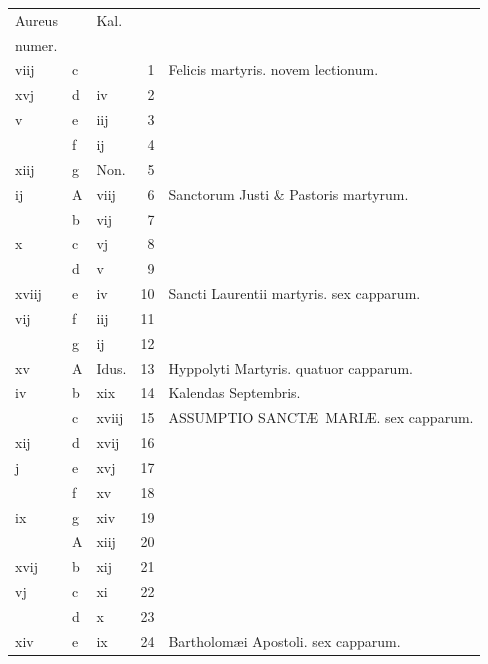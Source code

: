 \documentclass[letter,11pt]{book}
\begin{document}
\begin{center}
\begin{tabular}{l | l | l | r | l}
\color{Red}Aureus & & \color{Red} Kal. & \\
\color{Red}numer. & & & \\
\color{Red} viij & c & & 1 & Felicis martyris. \color{Red} novem lectionum. \\
\color{Red} xvj & d & \color{Red} iv & 2 & \\
\color{Red} v & e & \color{Red} iij & 3 & \\
\color{Red}  & f & \color{Red} ij & 4 & \\
\color{Red} xiij & g & Non. & 5 & \\
\color{Red} ij & \color{Red} A & \color{Red} viij & 6 & Sanctorum Justi \& Pastoris martyrum. \\
\color{Red}  & b & \color{Red} vij & 7 & \\
\color{Red} x & c & \color{Red} vj & 8 & \\
\color{Red}  & d & \color{Red} v & 9 & \\
\color{Red} xviij & e & \color{Red} iv & 10 & \color{Red} Sancti Laurentii martyris. \color{black} sex capparum. \\
\color{Red} vij & f & \color{Red} iij & 11 & \\
\color{Red}  & g & \color{Red} ij & 12 & \\
\color{Red} xv & \color{Red} A & Idus. & 13 & Hyppolyti Martyris. \color{Red} quatuor capparum. \\
\color{Red} iv & b & \color{Red} xix & 14 & \qquad \color{Red} Kalendas Septembris. \\
\color{Red}  & c & \color{Red} xviij & 15 & \color{Red} ASSUMPTIO SANCT\AE \ MARI\AE . \color{black} sex capparum. \\
\color{Red} xij & d & \color{Red} xvij & 16 & \\
\color{Red} j & e & \color{Red} xvj & 17 & \\
\color{Red}  & f & \color{Red} xv & 18 & \\
\color{Red} ix & g & \color{Red} xiv & 19 & \\
\color{Red}  & \color{Red} A & \color{Red} xiij & 20 & \\
\color{Red} xvij & b & \color{Red} xij & 21 & \\
\color{Red} vj & c & \color{Red} xi & 22 & \\
\color{Red}  & d & \color{Red} x & 23 & \\
\color{Red} xiv & e & \color{Red} ix & 24 & \color{Red} Bartholom\ae i Apostoli. \color{black} sex capparum. \\

\end{tabular}
\end{center}
\end{document}
